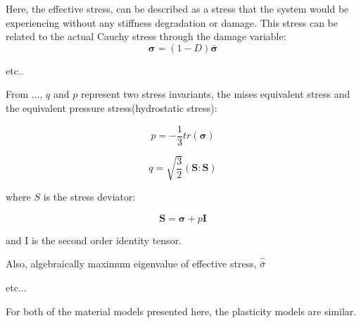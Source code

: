 Here, the effective stress,  can be described as a stress that the system would be experiencing without any stiffness degradation or damage. This stress can be related to the actual Cauchy stress through the damage variable: 
\begin{equation}
\boldsymbol{\sigma}=(1-D)\boldsymbol{\bar{\sigma}}\label{eqn:const7}
\end{equation}

etc..

From ..., $q$ and $p$ represent two stress invariants, the mises
equivalent stress and the equivalent pressure stress(hydrostatic stress):

\begin{equation}
p=-\frac{1}{3}tr\left(\boldsymbol{\sigma}\right)\label{eqn:druc3}
\end{equation}


\begin{equation}
q=\sqrt{\frac{3}{2}}\left(\mathbf{S}:\mathbf{S}\right)\label{eqn:druc4}
\end{equation}


where $S$ is the stress deviator:

\begin{equation}
\mathbf{S}=\boldsymbol{\sigma}+p\mathbf{I}\label{eqn:druc4-1}
\end{equation}


and I is the second order identity tensor. 


Also, algebraically maximum eigenvalue of effective stress, $\hat{\bar{\sigma}}$


etc...

For both of the material models presented here, the plasticity models are similar. 
